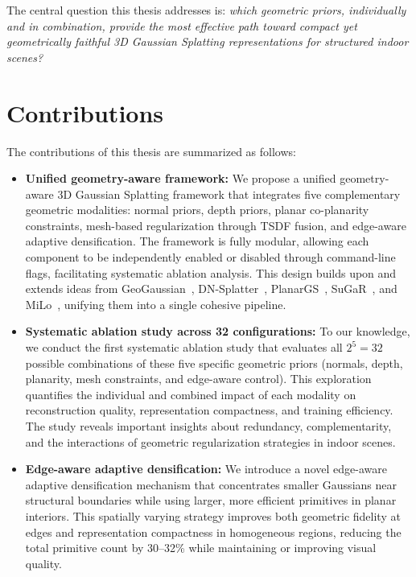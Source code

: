 The central question this thesis addresses is: \textit{which geometric priors, individually and in combination, provide the most effective path toward compact yet geometrically faithful 3D Gaussian Splatting representations for structured indoor scenes?}

\section{Contributions}

The contributions of this thesis are summarized as follows:

\begin{itemize}
    \item \textbf{Unified geometry-aware framework:} We propose a unified geometry-aware 3D Gaussian Splatting framework that integrates five complementary geometric modalities: normal priors, depth priors, planar co-planarity constraints, mesh-based regularization through TSDF fusion, and edge-aware adaptive densification. The framework is fully modular, allowing each component to be independently enabled or disabled through command-line flags, facilitating systematic ablation analysis. This design builds upon and extends ideas from GeoGaussian~\cite{geogaussian}, DN-Splatter~\cite{dn_splatter}, PlanarGS~\cite{planargs}, SuGaR~\cite{sugar}, and MiLo~\cite{milo2024}, unifying them into a single cohesive pipeline.

    \item \textbf{Systematic ablation study across 32 configurations:} To our knowledge, we conduct the first systematic ablation study that evaluates all $2^5 = 32$ possible combinations of these five specific geometric priors (normals, depth, planarity, mesh constraints, and edge-aware control). This exploration quantifies the individual and combined impact of each modality on reconstruction quality, representation compactness, and training efficiency. The study reveals important insights about redundancy, complementarity, and the interactions of geometric regularization strategies in indoor scenes.

    \item \textbf{Edge-aware adaptive densification:} We introduce a novel edge-aware adaptive densification mechanism that concentrates smaller Gaussians near structural boundaries while using larger, more efficient primitives in planar interiors. This spatially varying strategy improves both geometric fidelity at edges and representation compactness in homogeneous regions, reducing the total primitive count by 30--32\% while maintaining or improving visual quality.


\end{itemize}

